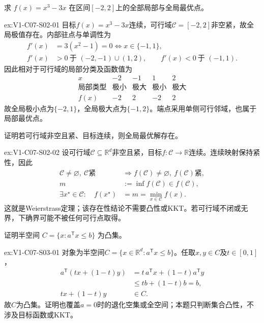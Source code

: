 \begin{SLChapterExercisePairSection}
\begin{exercise}\label{ex:V1-C07-S02-01}
求 $f(x)=x^3-3x$ 在区间$[-2,2]$上的全部局部与全局最优点。
\end{exercise}
\label{sol:V1-C07-S02-01}
\begin{chapterexercisesolution}{ex:V1-C07-S02-01}
目标$f(x)=x^3-3x$连续，可行域$\mathcal C=[-2,2]$非空紧，故全局极值存在。内部驻点与单调性为
\[
\begin{aligned}
f'(x)&=3(x^2-1)=0
\Longleftrightarrow x\in\{-1,1\},\\
f'(x)&>0\ \text{于 }(-2,-1)\cup(1,2),\qquad
f'(x)<0\ \text{于 }(-1,1).
\end{aligned}
\]
因此相对于可行域的局部分类及函数值为
\[
\begin{array}{c|cccc}
x&-2&-1&1&2\\ \hline
\text{局部类型}&\text{极小}&\text{极大}&\text{极小}&\text{极大}\\
f(x)&-2&2&-2&2
\end{array}
\]
故全局极小点为$\{-2,1\}$，全局极大点为$\{-1,2\}$。端点采用单侧可行邻域，也属于局部最优点。
\end{chapterexercisesolution}

\begin{exercise}\label{ex:V1-C07-S02-02}
证明若可行域非空且紧、目标连续，则全局最优解存在。
\end{exercise}
\label{sol:V1-C07-S02-02}
\begin{chapterexercisesolution}{ex:V1-C07-S02-02}
设可行域$\mathcal C\subseteq\mathbb R^d$非空且紧，目标$f:\mathcal C\to\mathbb R$连续。连续映射保持紧性，因此
\[
\begin{aligned}
\mathcal C\ne\varnothing,\ \mathcal C\text{紧}
&\Longrightarrow f(\mathcal C)\ne\varnothing,\ f(\mathcal C)\text{紧},\\
m&:=\inf f(\mathcal C)\in f(\mathcal C),\\
\exists x^\star\in\mathcal C:\quad
f(x^\star)&=m=\min_{x\in\mathcal C}f(x).
\end{aligned}
\]
这就是Weierstrass定理；该存在性结论不需要凸性或KKT。若可行域不闭或无界，下确界可能不被任何可行点取得。
\end{chapterexercisesolution}

\begin{exercise}\label{ex:V1-C07-S03-01}
证明半空间 $C=\{x:a^{\mathsf T}x\le b\}$ 为凸集。
\end{exercise}
\label{sol:V1-C07-S03-01}
\begin{chapterexercisesolution}{ex:V1-C07-S03-01}
对象为半空间$C=\{x\in\mathbb R^d:a^{\mathsf T}x\le b\}$。任取$x,y\in C$及$t\in[0,1]$，
\[
\begin{aligned}
a^{\mathsf T}(tx+(1-t)y)
&=t\,a^{\mathsf T}x+(1-t)a^{\mathsf T}y\\
&\le tb+(1-t)b=b,\\
tx+(1-t)y&\in C.
\end{aligned}
\]
故$C$为凸集。证明也覆盖$a=0$时的退化空集或全空间；本题只判断集合凸性，不涉及目标函数或KKT。
\end{chapterexercisesolution}


\end{SLChapterExercisePairSection}
